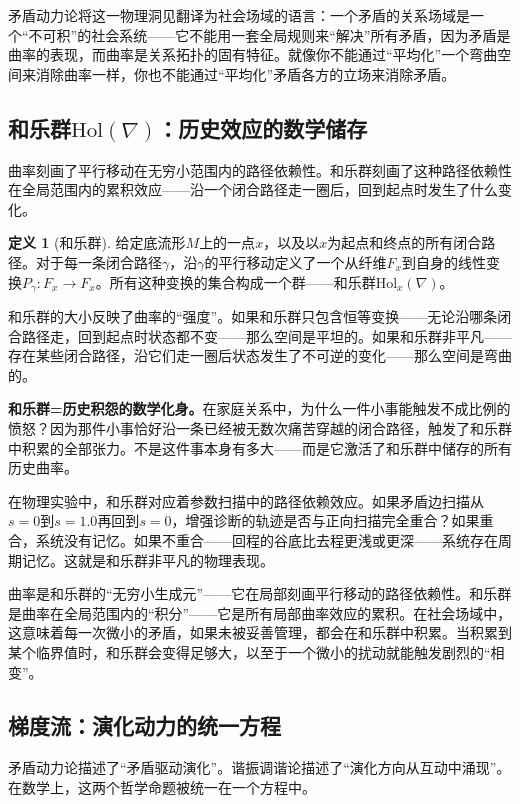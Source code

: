 \documentclass[11pt,a4paper]{book}
\theoremstyle{definition}
\newtheorem{definition}{定义}[chapter]
\begin{document}
矛盾动力论将这一物理洞见翻译为社会场域的语言：一个矛盾的关系场域是一个“不可积”的社会系统——它不能用一套全局规则来“解决”所有矛盾，因为矛盾是曲率的表现，而曲率是关系拓扑的固有特征。就像你不能通过“平均化”一个弯曲空间来消除曲率一样，你也不能通过“平均化”矛盾各方的立场来消除矛盾。

\subsection{和乐群$\text{Hol}(\nabla)$：历史效应的数学储存}

曲率刻画了平行移动在无穷小范围内的路径依赖性。和乐群刻画了这种路径依赖性在全局范围内的累积效应——沿一个闭合路径走一圈后，回到起点时发生了什么变化。

\begin{definition}[和乐群]
给定底流形$M$上的一点$x$，以及以$x$为起点和终点的所有闭合路径。对于每一条闭合路径$\gamma$，沿$\gamma$的平行移动定义了一个从纤维$F_x$到自身的线性变换$P_\gamma: F_x \to F_x$。所有这种变换的集合构成一个群——和乐群$\text{Hol}_x(\nabla)$。
\end{definition}

和乐群的大小反映了曲率的“强度”。如果和乐群只包含恒等变换——无论沿哪条闭合路径走，回到起点时状态都不变——那么空间是平坦的。如果和乐群非平凡——存在某些闭合路径，沿它们走一圈后状态发生了不可逆的变化——那么空间是弯曲的。

\textbf{和乐群=历史积怨的数学化身。}在家庭关系中，为什么一件小事能触发不成比例的愤怒？因为那件小事恰好沿一条已经被无数次痛苦穿越的闭合路径，触发了和乐群中积累的全部张力。不是这件事本身有多大——而是它激活了和乐群中储存的所有历史曲率。

在物理实验中，和乐群对应着参数扫描中的路径依赖效应。如果矛盾边扫描从$s=0$到$s=1.0$再回到$s=0$，增强诊断的轨迹是否与正向扫描完全重合？如果重合，系统没有记忆。如果不重合——回程的谷底比去程更浅或更深——系统存在周期记忆。这就是和乐群非平凡的物理表现。

曲率是和乐群的“无穷小生成元”——它在局部刻画平行移动的路径依赖性。和乐群是曲率在全局范围内的“积分”——它是所有局部曲率效应的累积。在社会场域中，这意味着每一次微小的矛盾，如果未被妥善管理，都会在和乐群中积累。当积累到某个临界值时，和乐群会变得足够大，以至于一个微小的扰动就能触发剧烈的“相变”。

\subsection{梯度流：演化动力的统一方程}

矛盾动力论描述了“矛盾驱动演化”。谐振调谐论描述了“演化方向从互动中涌现”。在数学上，这两个哲学命题被统一在一个方程中。
\end{document}
